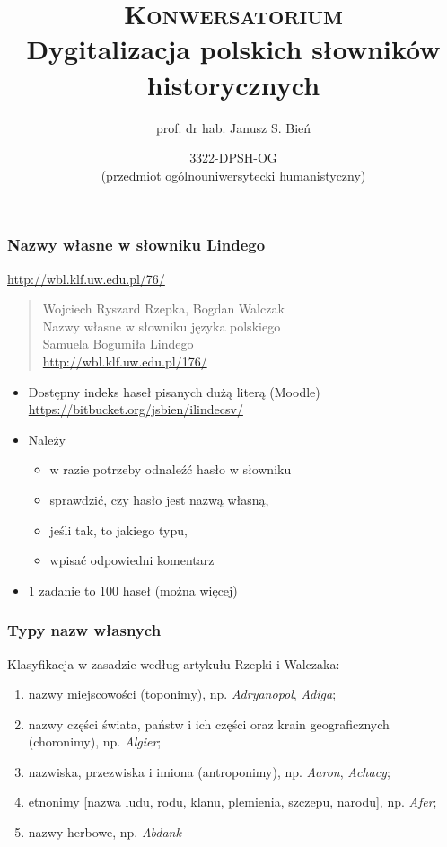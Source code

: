 \documentclass{beamer}
\title[Dygitalizacja polskich słowników
historycznych (3322-DPSH-OG) 2015-02-25 (2/16)]{\textsc{Konwersatorium}\\Dygitalizacja polskich
  słowników historycznych}
\author{prof. dr hab. Janusz S. Bień}
\institute{Katedra Lingwistyki Formalnej\\Wydział Neofilologii\\Uniwersytet Warszawski}
\date[2014]{3322-DPSH-OG\\(przedmiot ogólnouniwersytecki humanistyczny)}
\begin{document}
\begin{frame}
  \frametitle{Nazwy własne w słowniku Lindego}
  \url{http://wbl.klf.uw.edu.pl/76/}

  \begin{quote}
    Wojciech Ryszard Rzepka, Bogdan Walczak\\
Nazwy własne w słowniku języka polskiego\\
Samuela Bogumiła Lindego\\
\url{http://wbl.klf.uw.edu.pl/176/}
  \end{quote}
 \begin{itemize}
  \item Dostępny indeks haseł pisanych dużą literą (Moodle)\\
    \url{https://bitbucket.org/jsbien/ilindecsv/}
  \item Należy 
    \begin{itemize}
    \item w razie potrzeby odnaleźć hasło w słowniku
    \item sprawdzić, czy hasło jest nazwą własną,
    \item jeśli tak, to jakiego typu,
    \item wpisać odpowiedni komentarz
    \end{itemize}
  \item 1 zadanie to 100 haseł (można więcej)
  \end{itemize}
\end{frame}


\begin{frame}
  \frametitle{Typy nazw własnych}

  Klasyfikacja w zasadzie według artykułu Rzepki i Walczaka:
  \begin{enumerate}
  \item nazwy miejscowości (\alert{t}oponimy), np. \textit{Adryanopol},
    \alert{\textit{Adiga}};
  \item nazwy części świata, państw i ich części oraz krain
    geograficznych (\alert{c}horonimy), np. \textit{Algier};
  \item nazwiska, przezwiska i imiona (\alert{a}ntroponimy),
    np. \textit{Aaron}, \textit{Achacy};
  \item \alert{e}tnonimy [nazwa ludu, rodu, klanu, plemienia, szczepu,
    narodu], np. \textit{Afer};
    \item nazwy \alert{h}erbowe, np. \textit{Abdank}
  \end{enumerate}

\end{frame}
\end{document}
